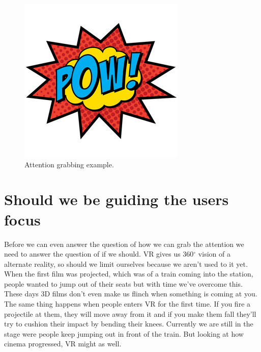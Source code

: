 \documentclass{report}
\newcommand{\comment}[1]{}
\begin{document}
				\begin{figure}[h!]
					\centering
					\includegraphics[width=\linewidth/3]{img/pow.jpg}
					\caption{Attention grabbing example.}
					\label{fig:pow}
				\end{figure}
				
				\section{Should we be guiding the users focus}
				Before we can even answer the question of how we can grab the attention we need to answer the question of if we should. VR gives us 360$^{\circ}$ vision of a alternate reality, so should we limit ourselves because we aren't used to it yet. When the first film was projected, which was of a train coming into the station, people wanted to jump out of their seats \comment{\todo{add source "der spiegel" for this}} but with time we've overcome this. These days 3D films don't even make us flinch when something is coming at you. The same thing happens when people enters VR for the first time. If you fire a projectile at them, they will move away from it and if you make them fall they'll try to cushion their impact by bending their knees. Currently we are still in the stage were people keep jumping out in front of the train. But looking at how cinema progressed, VR might as well. 
				
\end{document}
